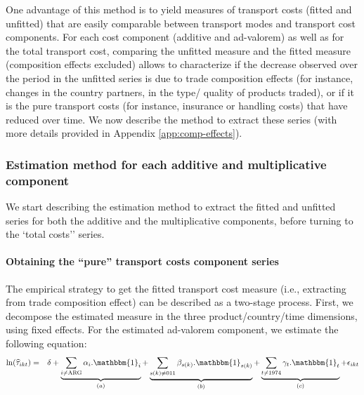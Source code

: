 \documentclass[a4paper,11pt]{article}
\begin{document}
One advantage of this method is to yield measures of transport costs (fitted and unfitted) that are easily comparable between transport modes and transport cost components.
For each cost component (additive and ad-valorem) as well as for the total transport cost, comparing the unfitted measure and the fitted measure (composition effects excluded) allows to characterize if the decrease observed over the period in the unfitted series is due to trade composition effects (for instance, changes in the country partners, in the type/ quality of products traded), or if it is the pure transport costs (for instance, insurance or handling costs) that have reduced over time.
We now describe the method to extract these series (with more details provided in Appendix \ref{app:comp-effects}).


\subsubsection{Estimation method for each additive and multiplicative component}

We start describing the estimation method to extract the fitted and unfitted series for both the additive and the multiplicative components, before turning to the `total costs'' series.
\smallskip

\paragraph{Obtaining the ``pure'' transport costs component series} The empirical strategy to get the fitted transport cost measure (i.e., extracting from trade composition effect) can be described as a two-stage process.
First, we decompose the estimated measure in the three product/country/time dimensions, using fixed effects.
For the estimated ad-valorem component, we estimate the following equation:
\begin{eqnarray}
\ln(\widehat{\tau}_{ikt})&=&\delta +\underbrace{\sum_{i \neq \text{ARG}}\alpha_i.\mathbbm{1}_i}_{(a)} + \underbrace{\sum_{s(k)\neq \text{011}}\beta_{s(k)}.\mathbbm{1}_{s(k)}}_{(b)} + \underbrace{\sum_{t \neq 1974}\gamma_t.\mathbbm{1}_t}_{(c)}+\epsilon_{ikt} \label{eq:compeffects_mult}
\end{eqnarray}
\end{document}
